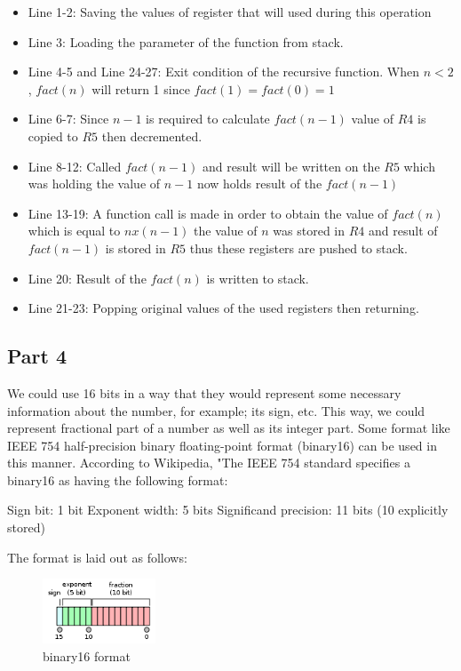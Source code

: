 \documentclass[pdftex,12pt,a4paper]{article}
\begin{document}
\begin{itemize}
    \item Line 1-2: Saving the values of register that will used during this operation
    \item Line 3: Loading the parameter of the function from stack.
    \item Line 4-5 and Line 24-27: Exit condition of the recursive function. When $n<2$, $fact(n)$ will return 1 since $fact(1)=fact(0)=1$
    \item Line 6-7: Since $n-1$ is required to calculate $fact(n-1)$ value of $R4$ is copied to $R5$ then decremented.
    \item Line 8-12: Called $fact(n-1)$ and result will be written on the $R5$ which was holding the value of $n-1$ now holds result of the $fact(n-1)$
    \item Line 13-19: A function call is made in order to obtain the value of $fact(n)$ which is equal to $n x (n-1)$ the value of $n$ was stored in $R4$ and result of $fact(n-1)$ is stored in $R5$ thus these registers are pushed to stack.
    \item Line 20: Result of the $fact(n)$ is written to stack.
    \item Line 21-23: Popping original values of the used registers then returning.
\end{itemize}

\subsection{Part 4}
We could use 16 bits in a way that they would represent some necessary information about the number, for example; its sign, etc. This way, we could represent fractional part of a number as well as its integer part. Some format like IEEE 754 half-precision binary floating-point format (binary16) can be used in this manner. According to Wikipedia, "The IEEE 754 standard specifies a binary16 as having the following format:

    Sign bit: 1 bit
    Exponent width: 5 bits
    Significand precision: 11 bits (10 explicitly stored)

The format is laid out as follows:

\begin{figure}[H]
    \centering
    \includegraphics[width=0.3\textwidth]{IEEE_binary16.png}
    \caption{binary16 format}
    \label{}
\end{figure}
\end{document}
